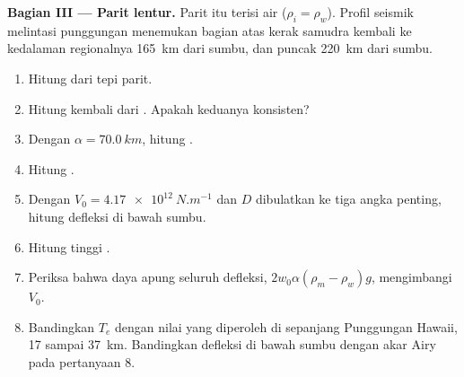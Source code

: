 \begin{problem}
\noindent\textbf{Bagian III --- Parit lentur.} Parit itu terisi air
($\rho_i = \rho_w$). Profil seismik melintasi punggungan menemukan bagian atas
kerak samudra kembali ke kedalaman regionalnya \qty{165}{km} dari sumbu, dan
puncak  \qty{220}{km} dari sumbu.
\begin{enumerate}[resume]
  \item Hitung  dari tepi parit.
  \item Hitung kembali dari . Apakah keduanya konsisten?
  \item Dengan $\alpha = \qty{70.0}{km}$, hitung .
  \item Hitung .
  \item Dengan $V_0 = \qty{4.17e12}{N.m^{-1}}$ dan $D$ dibulatkan ke tiga
        angka penting, hitung defleksi di bawah sumbu.
  \item Hitung tinggi .
  \item Periksa bahwa daya apung seluruh defleksi, $2w_0\alpha(\rho_m -
        \rho_w)g$, mengimbangi $V_0$.
  \item Bandingkan $T_e$ dengan nilai yang diperoleh di sepanjang Punggungan Hawaii, 17 sampai
        \qty{37}{km}. Bandingkan defleksi di bawah sumbu dengan akar Airy
        pada pertanyaan 8.
\end{enumerate}


\end{problem}
